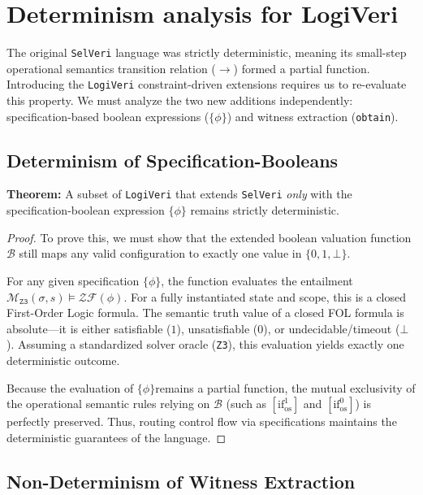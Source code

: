 \documentclass{article}
\begin{document}
\newpage
\section{Determinism analysis for LogiVeri}

The original \texttt{SelVeri} language was strictly deterministic, meaning its small-step operational semantics transition relation ($\rightarrow$) formed a partial function. Introducing the \texttt{LogiVeri} constraint-driven extensions requires us to re-evaluate this property. We must analyze the two new additions independently: specification-based boolean expressions ($\{ \phi \}$) and witness extraction (\texttt{obtain}).

\subsection{Determinism of Specification-Booleans}

\textbf{Theorem:} A subset of \texttt{LogiVeri} that extends \texttt{SelVeri} \textit{only} with the specification-boolean expression $\{ \phi \}$ remains strictly deterministic.

\begin{proof}
To prove this, we must show that the extended boolean valuation function $\mathcal{B}$ still maps any valid configuration to exactly one value in $\{0, 1, \bot\}$. 

For any given specification $\{ \phi \}$, the function evaluates the entailment $\mathcal{M}_{\mathtt{Z3}}(\sigma, s) \models \mathcal{ZF}(\phi)$. For a fully instantiated state and scope, this is a closed First-Order Logic formula. The semantic truth value of a closed FOL formula is absolute—it is either satisfiable ($1$), unsatisfiable ($0$), or undecidable/timeout ($\bot$). Assuming a standardized solver oracle (\texttt{Z3}), this evaluation yields exactly one deterministic outcome. 

Because the evaluation of $\{ \phi \}$remains a partial function, the mutual exclusivity of the operational semantic rules relying on $\mathcal{B}$ (such as $[\text{if}^{1}_{\text{os}}]$ and $[\text{if}^{0}_{\text{os}}]$) is perfectly preserved. Thus, routing control flow via specifications maintains the deterministic guarantees of the language.
\end{proof}

\subsection{Non-Determinism of Witness Extraction}
\end{document}
